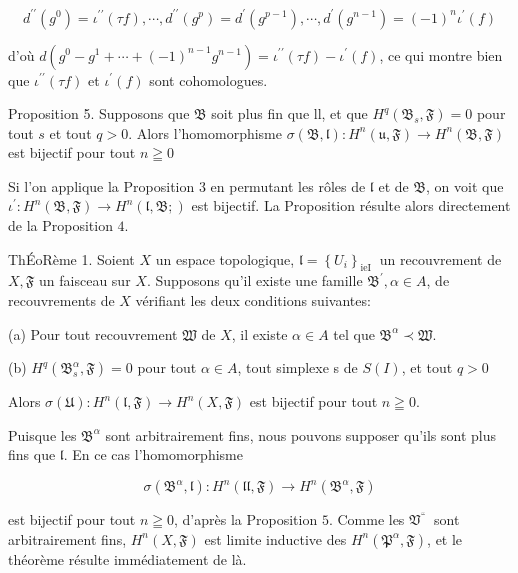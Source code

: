 $$
d^{\prime \prime}\left(g^{0}\right)=\iota^{\prime \prime}(\tau f), \cdots, d^{\prime \prime}\left(g^{p}\right)=d^{\prime}\left(g^{p-1}\right), \cdots, d^{\prime}\left(g^{n-1}\right)=(-1)^{n} \iota^{\prime}(f)
$$

d'où $d\left(g^{0}-g^{1}+\cdots+(-1)^{n-1} g^{n-1}\right)=\iota^{\prime \prime}(\tau f)-\iota^{\prime}(f)$, ce qui montre bien que $\iota^{\prime \prime}(\tau f)$ et $\iota^{\prime}(f)$ sont cohomologues.

Proposition 5. Supposons que $\mathfrak{B}$ soit plus fin que ll, et que $H^{q}\left(\mathfrak{B}_{s}, \mathfrak{F}\right)=0$ pour tout $s$ et tout $q>0$. Alors l'homomorphisme $\sigma(\mathfrak{B}, \mathfrak{l}): H^{n}(\mathfrak{u}, \mathfrak{F}) \rightarrow H^{n}(\mathfrak{B}, \mathfrak{F})$ est bijectif pour tout $n \geqq 0$

Si l'on applique la Proposition 3 en permutant les rôles de $\mathfrak{l}$ et de $\mathfrak{B}$, on voit que $\iota^{\prime}: H^{n}(\mathfrak{B}, \mathfrak{F}) \rightarrow H^{n}(\mathfrak{l}, \mathfrak{B} ; \mathfrak{})$ est bijectif. La Proposition résulte alors directement de la Proposition $4 .$

ThÉoRème 1. Soient $X$ un espace topologique, $\mathfrak{l}=\left\{U_{i}\right\}_{\text {ieI }}$ un recouvrement de $X, \mathfrak{F}$ un faisceau sur $X$. Supposons qu'il existe une famille $\mathfrak{B}^{\prime}, \alpha \in A$, de recouvrements de $X$ vérifiant les deux conditions suivantes:

(a) Pour tout recouvrement $\mathfrak{W}$ de $X$, il existe $\alpha \in A$ tel que $\mathfrak{B}^{\alpha} \prec \mathfrak{W}$.

(b) $H^{q}\left(\mathfrak{B}_{s}^{\alpha}, \mathfrak{F}\right)=0$ pour tout $\alpha \in A$, tout simplexe s de $S(I)$, et tout $q>0$

Alors $\sigma(\mathfrak{U}): H^{n}(\mathfrak{l}, \mathfrak{F}) \rightarrow H^{n}(X, \mathfrak{F})$ est bijectif pour tout $n \geqq 0$.

Puisque les $\mathfrak{B}^{\alpha}$ sont arbitrairement fins, nous pouvons supposer qu'ils sont plus fins que $\mathfrak{l}$. En ce cas l'homomorphisme

$$
\sigma\left(\mathfrak{B}^{\alpha}, \mathfrak{l}\right): H^{n}(\mathfrak{l l}, \mathfrak{F}) \rightarrow H^{n}\left(\mathfrak{B}^{\alpha}, \mathfrak{F}\right)
$$

est bijectif pour tout $n \geqq 0$, d'après la Proposition $5 .$ Comme les $\mathfrak{V}^{\text {“ }}$ sont arbitrairement fins, $H^{n}(X, \mathfrak{F})$ est limite inductive des $H^{n}\left(\mathfrak{P}^{\alpha}, \mathfrak{F}\right)$, et le théorème résulte immédiatement de là.

